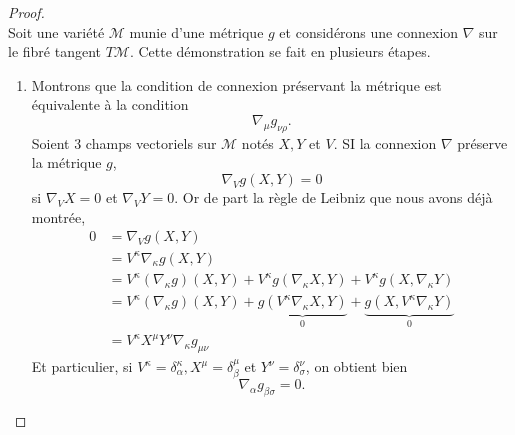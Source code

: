 \documentclass[a4paper,11pt]{report}
\theoremstyle{definition}
\theoremstyle{plain}
\theoremstyle{definition}
\theoremstyle{remark}
\newcommand{\M}{\mathscr{M}}
\begin{document}
                \begin{proof}${}$\\
                    Soit une variété $\M$ munie d'une métrique $g$ et considérons une connexion $\nabla$ sur le fibré tangent $T\M$.
                    Cette démonstration se fait en plusieurs étapes.
                    \begin{enumerate}[label = \textit{\roman*)}]
                            \item Montrons que la condition de connexion préservant la            métrique est équivalente à la condition
                                \begin{equation}
                                    \nabla_\mu g_{\nu\rho}.
                                \end{equation}
                                Soient $3$ champs vectoriels sur $\M$ notés $X,Y$ et $V$. SI la connexion $\nabla$ préserve la métrique $g$, 
                                \begin{equation}
                                    \nabla_Vg(X,Y) = 0
                                \end{equation}
                                si $\nabla_V X = 0$ et $\nabla_V Y = 0$. Or de part la règle de Leibniz que nous avons déjà montrée,
                                \begin{align}
                                    0 &= \nabla_Vg(X,Y) \\
                                    &= V^\kappa \nabla_\kappa g(X,Y)\\
                                    &= V^\kappa(\nabla_\kappa g)(X,Y) + V^\kappa g( \nabla_\kappa X,Y) + V^\kappa g(X, \nabla_\kappa Y)\\
                                    &= V^\kappa(\nabla_\kappa g)(X,Y) + \underbrace{g(V^\kappa \nabla_\kappa X,Y)}_{0} +  \underbrace{g(X, V^\kappa\nabla_\kappa Y)}_{0}\\
                                    &= V^\kappa X^\mu Y^\nu \nabla_\kappa g_{\mu\nu}
                                \end{align}
                                Et particulier, si $V^\kappa = \delta^\kappa_\alpha,X^\mu = \delta^\mu_\beta$ et $Y^\nu = \delta^\nu_\sigma$, on obtient bien
                                \begin{equation}
                                    \nabla_\alpha g_{\beta\sigma} = 0.
                                \end{equation}
                                

\end{enumerate}
\end{proof}
\end{document}
